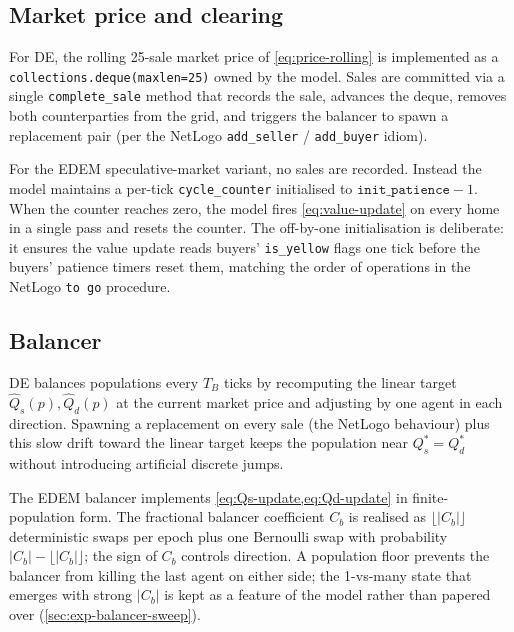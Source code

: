 \subsection{Market price and clearing}
\label{sec:implementation-clearing}

For DE, the rolling 25-sale market price of \cref{eq:price-rolling}
is implemented as a \texttt{collections.deque(maxlen=25)} owned by
the model. Sales are committed via a single \texttt{complete\_sale}
method that records the sale, advances the deque, removes both
counterparties from the grid, and triggers the balancer to spawn a
replacement pair (per the NetLogo \texttt{add\_seller} /
\texttt{add\_buyer} idiom).

For the EDEM speculative-market variant, no sales are recorded.
Instead the model maintains a per-tick \texttt{cycle\_counter}
initialised to $\texttt{init\_patience} - 1$. When the counter
reaches zero, the model fires \cref{eq:value-update} on every home in
a single pass and resets the counter. The off-by-one initialisation is
deliberate: it ensures the value update reads buyers' \texttt{is\_yellow}
flags one tick before the buyers' patience timers reset them, matching
the order of operations in the NetLogo \texttt{to go} procedure.

\subsection{Balancer}
\label{sec:implementation-balancer}

DE balances populations every $T_{B}$ ticks by recomputing the linear
target $\hat{Q}_{s}(p), \hat{Q}_{d}(p)$ at the current market price
and adjusting by one agent in each direction. Spawning a replacement
on every sale (the NetLogo behaviour) plus this slow drift toward the
linear target keeps the population near \mbox{$Q_{s}^{*} = Q_{d}^{*}$}
without introducing artificial discrete jumps.

The EDEM balancer implements \cref{eq:Qs-update,eq:Qd-update} in
finite-population form. The fractional balancer coefficient $C_{b}$ is
realised as $\lfloor |C_{b}| \rfloor$ deterministic swaps per epoch
plus one Bernoulli swap with probability $|C_{b}| - \lfloor |C_{b}|
\rfloor$; the sign of $C_{b}$ controls direction. A population floor
prevents the balancer from killing the last agent on either side; the
1-vs-many state that emerges with strong $|C_{b}|$ is kept as a feature
of the model rather than papered over (\cref{sec:exp-balancer-sweep}).

